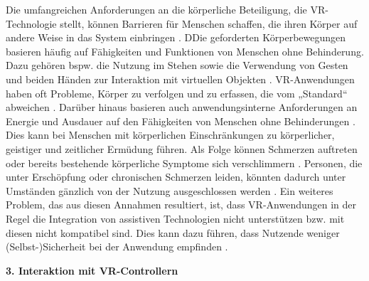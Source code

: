 Die umfangreichen Anforderungen an die körperliche Beteiligung, die VR-Technologie stellt, können Barrieren für Menschen schaffen, die ihren Körper auf andere Weise in das System einbringen \citep{gerling_critical_2021}. DDie geforderten Körperbewegungen basieren häufig auf Fähigkeiten und Funktionen von Menschen ohne Behinderung. Dazu gehören bspw. die Nutzung im Stehen sowie die Verwendung von Gesten und beiden Händen zur Interaktion mit virtuellen Objekten \citep{wong_survey_2017}. VR-Anwendungen haben oft Probleme, Körper zu verfolgen und zu erfassen, die vom „Standard“ abweichen \citep{wong_survey_2017}. Darüber hinaus basieren auch anwendungsinterne Anforderungen an Energie und Ausdauer auf den Fähigkeiten von Menschen ohne Behinderungen \citep{wong_survey_2017}. Dies kann bei Menschen mit körperlichen Einschränkungen zu körperlicher, geistiger und zeitlicher Ermüdung führen. Als Folge können Schmerzen auftreten oder bereits bestehende körperliche Symptome sich verschlimmern \citep{creed_inclusive_2023}. Personen, die unter Erschöpfung oder chronischen Schmerzen leiden, könnten dadurch unter Umständen gänzlich von der Nutzung ausgeschlossen werden \citep{wong_survey_2017}. Ein weiteres Problem, das aus diesen Annahmen resultiert, ist, dass VR-Anwendungen in der Regel die Integration von assistiven Technologien nicht unterstützen bzw. mit diesen nicht kompatibel sind. Dies kann dazu führen, dass Nutzende weniger (Selbst-)Sicherheit bei der Anwendung empfinden \citep{creed_inclusive_2023}. 

{\normalfont \bfseries 3. Interaktion mit VR-Controllern} 

